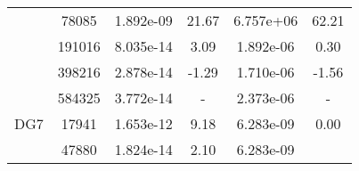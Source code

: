 \begin{table}
\begin{center}
{\begin{tabular}{| l | c | c | c | c | c |}
            &78085
            
                &1.892e-09
                
                &21.67
                
                &6.757e+06
                
                &62.21\\
                
            &191016
            
                &8.035e-14
                
                &3.09
                
                &1.892e-06
                
                &0.30\\
                
            &398216
            
                &2.878e-14
                
                &-1.29
                
                &1.710e-06
                
                &-1.56\\
                
            &584325
            
                &3.772e-14
                
                &-
                
                &2.373e-06
                
                &-\\
                \hline
        \hline
        \hspace{0.1cm}DG7\hspace{0.1cm}    
        
            &17941
            
                &1.653e-12
                
                &9.18
                
                &6.283e-09
                
                &0.00\\
                
            &47880
            
                &1.824e-14
                
                &2.10
                
                &6.283e-09
                

\end{tabular}}
\end{center}
\end{table}
